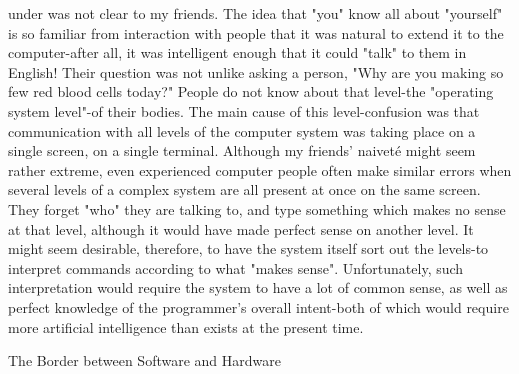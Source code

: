        under was not clear to my friends. The idea that "you" know all about "yourself"
       is so familiar from interaction with people that it was natural to extend it to the
       computer-after all, it was intelligent enough that it could "talk" to them in
       English! Their question was not unlike asking a person, "Why are you making so
       few red blood cells today?" People do not know about that level-the "operating
       system level"-of their bodies.
                The main cause of this level-confusion was that communication with all
       levels of the computer system was taking place on a single screen, on a single
       terminal. Although my friends' naiveté might seem rather extreme, even
       experienced computer people often make similar errors when several levels of a
       complex system are all present at once on the same screen. They forget "who"
       they are talking to, and type something which makes no sense at that level,
       although it would have made perfect sense on another level. It might seem
       desirable, therefore, to have the system itself sort out the levels-to interpret
       commands according to what "makes sense". Unfortunately, such interpretation
       would require the system to have a lot of common sense, as well as perfect
       knowledge of the programmer's overall intent-both of which would require more
       artificial intelligence than exists at the present time.

                            The Border between Software and Hardware


